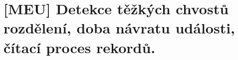 \chapter{[MEU] Detekce těžkých chvostů rozdělení, doba návratu události, čítací proces rekordů.}





